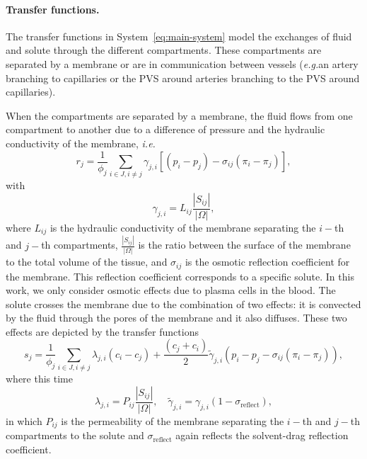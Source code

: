\documentclass[10pt,letterpaper]{article}
\newcommand{\ie}{\emph{i.e.}\;}
\newcommand{\eg}{\emph{e.g.}\;}
\newcommand{\1}{^{(1)}}
\newcommand{\2}{^{(2)}}
\newcommand {\f}   {\frac}
\newcommand{\abs}[1]{\left\lvert#1\right\rvert}
\begin{document}
\paragraph{Transfer functions. }
The transfer functions in System~\eqref{eq:main-system} model the exchanges of fluid and solute through the different compartments. 
These compartments are separated by a membrane or are in communication between vessels (\eg an artery branching to capillaries or the PVS around arteries branching to the PVS around capillaries).

When the compartments are separated by a membrane, the fluid flows from one compartment to another due to a difference of pressure and the hydraulic conductivity of the membrane, \ie 
\begin{equation}
    r_j = \frac{1}{\phi_j}\sum_{i\in J, i\neq j} \gamma_{j , i} \left[(p_i - p_j)-\sigma_{ij}(\pi_i-\pi_j)\right],
\end{equation} 
with 
\begin{equation}
\gamma_{j , i} = L_{ij} \f{\abs{S_{ij}}}{\abs{\Omega}},
\end{equation}
where $L_{ij}$ is the hydraulic conductivity of the membrane separating the $i-$th and $j-$th compartments, $\f{\abs{S_{ij}}}{\abs{\Omega}}$ is the ratio between the surface of the membrane to the total volume of the tissue, and $\sigma_{ij}$ is the osmotic reflection coefficient for the membrane. This reflection coefficient corresponds to a specific solute. In this work, we only consider osmotic effects due to plasma cells in the blood. 
The solute crosses the membrane due to the combination of two effects: it is convected by the fluid through the pores of the membrane and it also diffuses. These two effects are depicted by the transfer functions
\begin{equation}
    s_j = \frac{1}{\phi_j}  \sum_{i\in J, i\neq j}\lambda_{j , i} ( c_i- c_j) +  \frac{(c_j+c_i)}{2} \tilde \gamma_{j , i} (p_i - p_j-\sigma_{ij}(\pi_i-\pi_j)) ,
\end{equation}
where this time 
\[
    \lambda_{j , i} = P_{ij} \f{\abs{S_{ij}}}{\abs{\Omega}}, \quad \tilde \gamma_{j , i} =  \gamma_{j , i} (1-\sigma_\text{reflect}),
\]
in which $P_{ij}$ is the permeability of the membrane separating the $i-$th and $j-$th compartments to the solute and $\sigma_\text{reflect}$ again reflects the solvent-drag reflection coefficient. 
\end{document}
